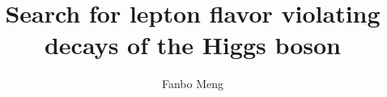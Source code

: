 \documentclass[final,numrefs,sort&compress,twoadvisors]{nddiss2e}
\begin{document}
 
\frontmatter %

\title{Search for lepton flavor violating decays of the Higgs boson}
\author{Fanbo Meng}

\maketitle
%
%

\makecopyright
\end{document}
